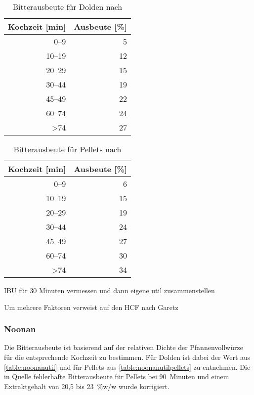 \documentclass[a4paper,parskip=half]{scrartcl}
\begin{document}
\begin{table}[H]
\centering
\begin{tabular}{rr}
\toprule
\multicolumn{1}{c}{\textbf{Kochzeit [min]}} & \multicolumn{1}{c}{\textbf{Ausbeute [\%]}} \\
\midrule
0–9            & 5  \\
10–19          & 12 \\
20–29          & 15 \\
30–44          & 19 \\
45–49          & 22 \\
60–74          & 24 \\
>74            & 27 \\
\bottomrule
\end{tabular}
\caption{Bitterausbeute für Dolden nach \citeauthor{Daniels1996} \parencite[80]{Daniels1996}}
\label{table:danielsutil}
\end{table}

\begin{table}[H]
\centering
\begin{tabular}{rr}
\toprule
\multicolumn{1}{c}{\textbf{Kochzeit [min]}} & \multicolumn{1}{c}{\textbf{Ausbeute [\%]}} \\
\midrule
0–9            & 6 \\
10–19          & 15 \\
20–29          & 19 \\
30–44          & 24 \\
45–49          & 27 \\
60–74          & 30 \\
>74            & 34 \\
\bottomrule
\end{tabular}
\caption{Bitterausbeute für Pellets nach \citeauthor{Daniels1996} \parencite[80]{Daniels1996}}
\label{table:danielsutilpellets}
\end{table}

\parencite[85]{Daniels1996}
IBU für 30 Minuten vermessen und dann eigene util zusammenstellen

\parencite[86]{Daniels1996}
Um mehrere Faktoren verweist auf den HCF nach Garetz

\subsubsection*{Noonan}

Die Bitterausbeute ist basierend auf der relativen Dichte der Pfannenvollwürze für
die entsprechende  Kochzeit zu bestimmen. Für Dolden ist dabei der Wert
aus \autoref{table:noonanutil} und für Pellets aus \autoref{table:noonanutilpellets}
zu entnehmen. Die in Quelle fehlerhafte Bitterausbeute für Pellets bei 90~Minuten und
einem Extraktgehalt von 20,5 bis 23~\%w/w wurde korrigiert.
\end{document}
